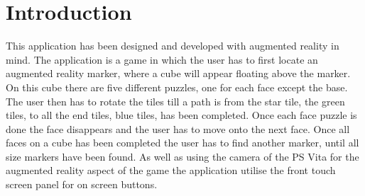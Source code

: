 \section{Introduction}\label{sc:Intro}
This application has been designed and developed with augmented reality in mind.
The application is a game in which the user has to first locate an augmented reality marker, where a cube will appear floating above the marker.
On this cube there are five different puzzles, one for each face except the base.
The user then has to rotate the tiles till a path is from the star tile, the green tiles, to all the end tiles, blue tiles, has been completed.
Once each face puzzle is done the face disappears and the user has to move onto the next face. Once all faces on a cube has been completed the user has to find another marker, until all size markers have been found.
As well as using the camera of the PS Vita for the augmented reality aspect of the game the application utilise the front touch screen panel for on screen buttons. 
